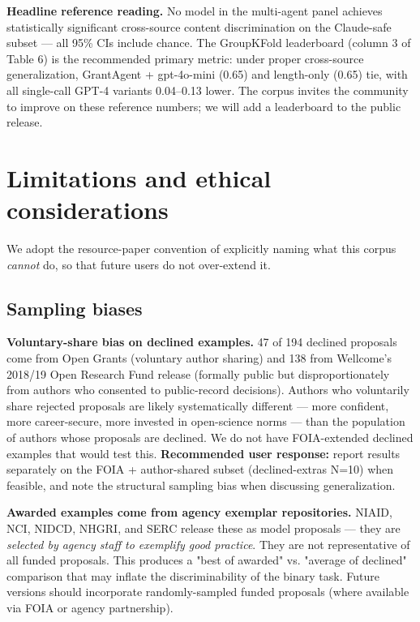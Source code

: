 \documentclass[11pt]{article}
\begin{document}
\textbf{Headline reference reading.} No model in the multi-agent panel achieves statistically significant cross-source content discrimination on the Claude-safe subset --- all 95\% CIs include chance. The GroupKFold leaderboard (column 3 of Table 6) is the recommended primary metric: under proper cross-source generalization, GrantAgent + gpt-4o-mini (0.65) and length-only (0.65) tie, with all single-call GPT-4 variants 0.04--0.13 lower. The corpus invites the community to improve on these reference numbers; we will add a leaderboard to the public release.

\section{Limitations and ethical considerations}

We adopt the resource-paper convention of explicitly naming what this corpus \emph{cannot} do, so that future users do not over-extend it.

\subsection{Sampling biases}

\textbf{Voluntary-share bias on declined examples.} 47 of 194 declined proposals come from Open Grants (voluntary author sharing) and 138 from Wellcome's 2018/19 Open Research Fund release (formally public but disproportionately from authors who consented to public-record decisions). Authors who voluntarily share rejected proposals are likely systematically different --- more confident, more career-secure, more invested in open-science norms --- than the population of authors whose proposals are declined. We do not have FOIA-extended declined examples that would test this. \textbf{Recommended user response:} report results separately on the FOIA + author-shared subset (declined-extras N=10) when feasible, and note the structural sampling bias when discussing generalization.

\textbf{Awarded examples come from agency exemplar repositories.} NIAID, NCI, NIDCD, NHGRI, and SERC release these as model proposals --- they are \emph{selected by agency staff to exemplify good practice}. They are not representative of all funded proposals. This produces a "best of awarded" vs. "average of declined" comparison that may inflate the discriminability of the binary task. Future versions should incorporate randomly-sampled funded proposals (where available via FOIA or agency partnership).
\end{document}
